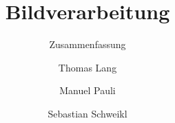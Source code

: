 



\title{Bildverarbeitung}
\subtitle{Zusammenfassung}
\author{Thomas Lang\and{}Manuel Pauli\and{}Sebastian Schweikl}

\maketitle

\tableofcontents









\backmatter
\appendix
\appendixpage
\addappheadtotoc
\renewcommand{\thesection}{\Alph{section}}




